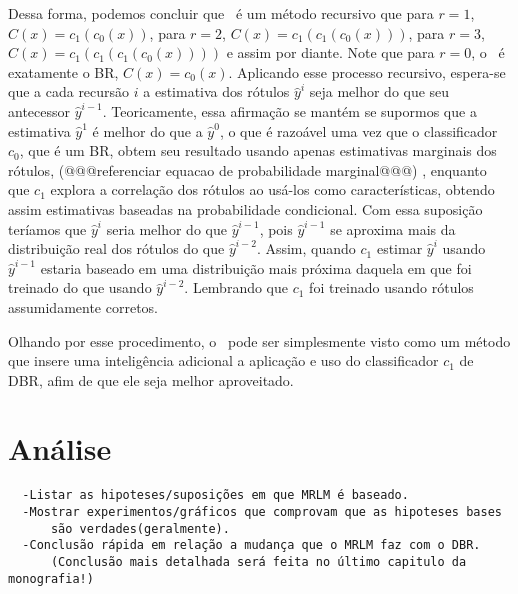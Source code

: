  Dessa forma, podemos concluir que \MRLM~é um método recursivo que
 para $r=1$, $C(x)=c_1(c_0(x))$,
 para $r=2$, $C(x)=c_1(c_1(c_0(x)))$,
 para $r=3$, $C(x)=c_1(c_1(c_1(c_0(x))))$ e assim por diante.
 Note que para $r=0$, o \MRLMa~é exatamente o BR, $C(x)=c_0(x)$.
 Aplicando esse processo recursivo, espera-se que a cada recursão $i$ a estimativa dos rótulos $\hat{y}^i$ seja melhor do que
 seu antecessor $\hat{y}^{i-1}$. Teoricamente, essa afirmação se mantém se supormos que a estimativa $\hat{y}^1$ é melhor do que a $\hat{y}^0$, 
 o que é razoável uma vez que o classificador $c_0$, que é um BR, obtem seu resultado usando apenas estimativas marginais dos rótulos,
 (@@@referenciar equacao de probabilidade marginal@@@)%
 , enquanto que $c_1$ explora a correlação dos rótulos ao usá-los como características, obtendo assim 
 estimativas baseadas na probabilidade condicional.
 Com essa suposição teríamos que $\hat{y}^i$ seria melhor do que $\hat{y}^{i-1}$, pois $\hat{y}^{i-1}$ se aproxima
 mais da distribuição real dos rótulos do que $\hat{y}^{i-2}$. Assim, quando $c_1$ estimar $\hat{y}^i$ usando $\hat{y}^{i-1}$ estaria baseado em 
 uma distribuição mais próxima daquela em que foi treinado do que usando $\hat{y}^{i-2}$.
 Lembrando que $c_1$ foi treinado usando rótulos assumidamente corretos.
 
 Olhando por esse procedimento, o \MRLMa~pode ser simplesmente visto como um método que insere uma inteligência
 adicional a aplicação e uso do classificador $c_1$ de DBR, afim de que ele seja melhor aproveitado.
 
 
 
 \section{Análise}
 \begin{verbatim}
  -Listar as hipoteses/suposições em que MRLM é baseado.
  -Mostrar experimentos/gráficos que comprovam que as hipoteses bases
      são verdades(geralmente).
  -Conclusão rápida em relação a mudança que o MRLM faz com o DBR.
      (Conclusão mais detalhada será feita no último capitulo da monografia!)
 \end{verbatim}
 
